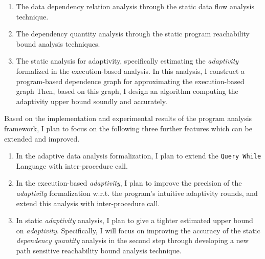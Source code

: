 \begin{enumerate}
\begin{enumerate}
\item The data dependency relation analysis through the static data flow analysis technique.
\item The dependency quantity analysis through the static program reachability bound analysis techniques.
\item 
The static analysis for adaptivity, specifically estimating the \emph{adaptivity} formalized in the execution-based analysis.
In this analysis, I construct a program-based dependence graph for approximating the execution-based graph
Then, based on this graph, I design an algorithm
computing the adaptivity upper bound soundly 
and accurately.
\end{enumerate}
\end{enumerate}%


Based on the implementation and experimental results of the program analysis framework,
I plan to focus on the following three further features which can be extended and improved.
\begin{enumerate}
    \item In the adaptive data analysis formalization, I plan to extend the {\tt Query While} Language with inter-procedure call.
    \item In the execution-based \emph{adaptivity},
    I plan to improve the precision of the \emph{adaptivity} formalization w.r.t. the program's intuitive adaptivity rounds,
and extend this analysis with inter-procedure call.
\item In static \emph{adaptivity} analysis, I plan to give a tighter estimated upper bound on \emph{adaptivity}.
Specifically, I will focus on improving the accuracy of the static \emph{dependency quantity} analysis in the second step through 
developing a new path sensitive reachability bound analysis technique. 
\end{enumerate}